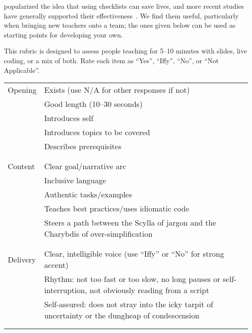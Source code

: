 
\cite{Gawa2007} popularized the idea that using checklists can save lives,
and more recent studies have generally supported their effectiveness~\cite{Avel2013,Urba2014,Rams2019}.
We find them useful,
particularly when bringing new teachers onto a team;
the ones given below can be used as starting points for developing your own.


This rubric is designed to assess people teaching for 5--10 minutes
with slides, live coding, or a mix of both.
Rate each item as ``Yes'', ``Iffy'', ``No'', or ``Not Applicable''.

\noindent
\begin{longtable}{p{}p{}}

  Opening
  & Exists (use N/A for other responses if not) \\
  & Good length (10--30 seconds) \\
  & Introduces self \\
  & Introduces topics to be covered \\
  & Describes prerequisites \\
  \\ [-1.5ex] \hline \\ [-1.5ex]

  Content
  & Clear goal/narrative arc \\
  & Inclusive language \\
  & Authentic tasks/examples \\
  & Teaches best practices/uses idiomatic code \\
  & Steers a path between the Scylla of jargon and the Charybdis of over-simplification \\
  \\ [-1.5ex] \hline \\ [-1.5ex]

  Delivery
  & Clear, intelligible voice (use ``Iffy'' or ``No'' for strong accent) \\
  & Rhythm: not too fast or too slow, no long pauses or self-interruption, not obviously reading from a script \\
  & Self-assured: does not stray into the icky tarpit of uncertainty or the dungheap of condescension \\
  \\ [-1.5ex] \hline \\ [-1.5ex]


\end{longtable}
